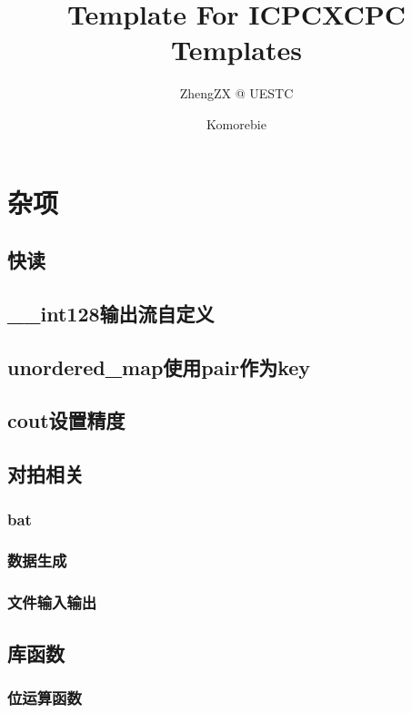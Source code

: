 \documentclass[10pt,a4paper]{article}
\title{Template For ICPC}
\author{ZhengZX @ UESTC}
\begin{document}
\title{XCPC Templates}
\author {Komorebie}
\maketitle
\tableofcontents
\newpage
\section{杂项}
\subsection{快读}

\subsection{\_\_int128输出流自定义}

\subsection{unordered\_map使用pair作为key}
\begin{spacing}{1.5}

\end{spacing}

\subsection{cout设置精度}

\subsection{对拍相关}
\subsubsection{bat}

\subsubsection{数据生成}

\subsubsection{文件输入输出}

\subsection{库函数}
\subsubsection{位运算函数}

\end{document}
